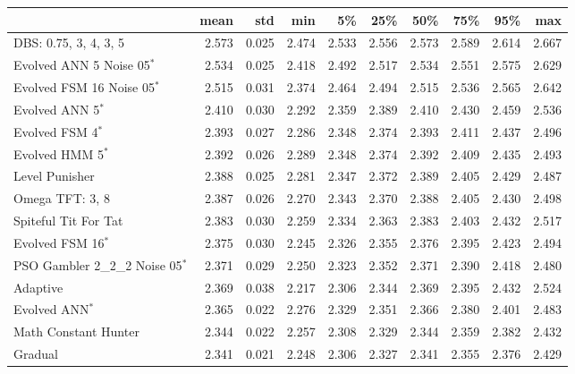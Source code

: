 \begin{tabular}{lrrrrrrrrr}
\toprule
{} &   mean &    std &    min &     5\% &    25\% &    50\% &    75\% &    95\% &    max \\
\midrule
DBS: 0.75, 3, 4, 3, 5      &  2.573 &  0.025 &  2.474 &  2.533 &  2.556 &  2.573 &  2.589 &  2.614 &  2.667 \\
Evolved ANN 5 Noise 05$^{*}$    &  2.534 &  0.025 &  2.418 &  2.492 &  2.517 &  2.534 &  2.551 &  2.575 &  2.629 \\
Evolved FSM 16 Noise 05$^{*}$    &  2.515 &  0.031 &  2.374 &  2.464 &  2.494 &  2.515 &  2.536 &  2.565 &  2.642 \\
Evolved ANN 5$^{*}$              &  2.410 &  0.030 &  2.292 &  2.359 &  2.389 &  2.410 &  2.430 &  2.459 &  2.536 \\
Evolved FSM 4$^{*}$              &  2.393 &  0.027 &  2.286 &  2.348 &  2.374 &  2.393 &  2.411 &  2.437 &  2.496 \\
Evolved HMM 5$^{*}$              &  2.392 &  0.026 &  2.289 &  2.348 &  2.374 &  2.392 &  2.409 &  2.435 &  2.493 \\
Level Punisher             &  2.388 &  0.025 &  2.281 &  2.347 &  2.372 &  2.389 &  2.405 &  2.429 &  2.487 \\
Omega TFT: 3, 8            &  2.387 &  0.026 &  2.270 &  2.343 &  2.370 &  2.388 &  2.405 &  2.430 &  2.498 \\
Spiteful Tit For Tat       &  2.383 &  0.030 &  2.259 &  2.334 &  2.363 &  2.383 &  2.403 &  2.432 &  2.517 \\
Evolved FSM 16$^{*}$             &  2.375 &  0.030 &  2.245 &  2.326 &  2.355 &  2.376 &  2.395 &  2.423 &  2.494 \\
PSO Gambler 2\_2\_2 Noise 05$^{*}$ &  2.371 &  0.029 &  2.250 &  2.323 &  2.352 &  2.371 &  2.390 &  2.418 &  2.480 \\
Adaptive                   &  2.369 &  0.038 &  2.217 &  2.306 &  2.344 &  2.369 &  2.395 &  2.432 &  2.524 \\
Evolved ANN$^{*}$                &  2.365 &  0.022 &  2.276 &  2.329 &  2.351 &  2.366 &  2.380 &  2.401 &  2.483 \\
Math Constant Hunter       &  2.344 &  0.022 &  2.257 &  2.308 &  2.329 &  2.344 &  2.359 &  2.382 &  2.432 \\
Gradual                    &  2.341 &  0.021 &  2.248 &  2.306 &  2.327 &  2.341 &  2.355 &  2.376 &  2.429 \\
\bottomrule
\end{tabular}
